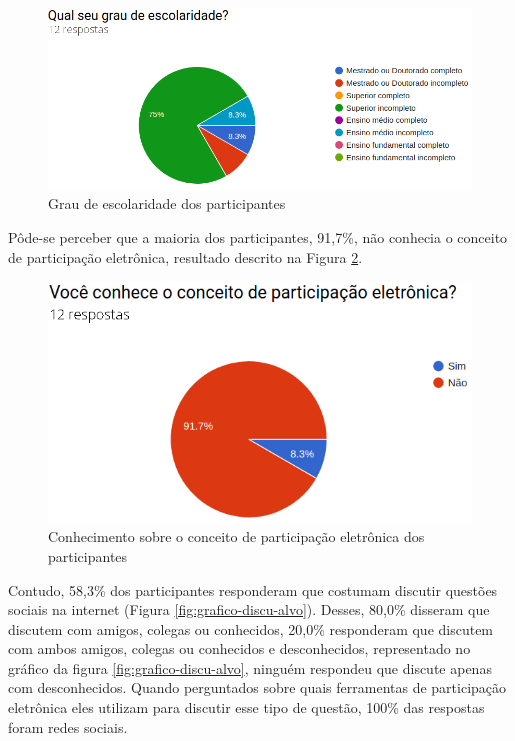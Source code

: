 \begin{figure}[!ht]
    \centering
    \includegraphics[scale=0.4]{./figuras/grau_escolaridade.png}
    \caption{Grau de escolaridade dos participantes}
    \label{fig:grafico-grau}
\end{figure}

\par
Pôde-se perceber que a maioria dos participantes, 91,7\%, não conhecia o conceito de participação eletrônica, resultado descrito na Figura \ref{fig:grafico-participacao}.

\begin{figure}[!ht]
    \centering
    \includegraphics[scale=0.4]{./figuras/conhece_participacao_eletronica.png}
    \caption{Conhecimento sobre o conceito de participação eletrônica dos participantes}
    \label{fig:grafico-participacao}
\end{figure}

\par
Contudo, 58,3\% dos participantes responderam que costumam discutir questões sociais na internet (Figura \ref{fig:grafico-discu-alvo}). 
Desses, 80,0\% disseram que  discutem com amigos, colegas ou conhecidos, 20,0\%  responderam que discutem com ambos amigos, colegas ou conhecidos e desconhecidos, representado
no gráfico da figura \ref{fig:grafico-discu-alvo}, ninguém respondeu que discute apenas com desconhecidos. Quando perguntados sobre quais ferramentas de participação 
eletrônica eles utilizam para discutir esse tipo de questão, 100\% das respostas foram redes sociais. 

